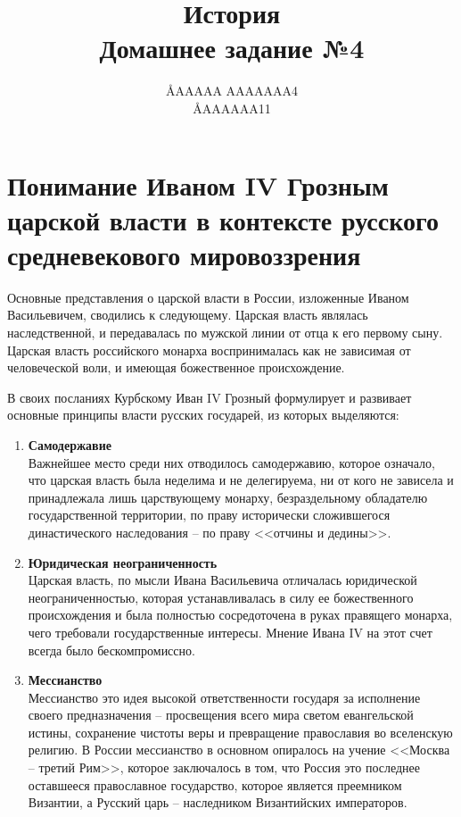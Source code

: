 \documentclass[12pt]{article}
\title{История \\ Домашнее задание №4}
\author{\AA{AAAAA AAAAAAA}{4} \\ \AA{AAAAAA}{11}}
\newcommand{\red}[1]{{\color{red}{#1}}}
\begin{document}
  \maketitle
  \setcounter{section}{1}

  \section{Понимание Иваном IV Грозным царской власти в контексте русского средневекового мировоззрения}

  Основные представления о царской власти в России, изложенные Иваном Васильевичем, сводились к следующему.
  Царская власть являлась наследственной, и передавалась по мужской линии от отца к его первому сыну.
  Царская власть российского монарха воспринималась как не зависимая от человеческой воли, и имеющая божественное происхождение.

  В своих посланиях Курбскому Иван IV Грозный формулирует и развивает основные принципы власти русских государей, из которых выделяются:

  \begin{enumerate}[label=\textbf{\large\arabic*}]
    \item {\bf\large Самодержавие} \\
    Важнейшее место среди них отводилось самодержавию, которое означало,
    что царская власть была неделима и не делегируема, ни от кого не зависела и принадлежала лишь царствующему монарху,
    безраздельному обладателю государственной территории,
    по праву исторически сложившегося династического наследования -- по праву <<отчины и дедины>>.

    \item {\bf\large Юридическая неограниченность} \\
    Царская власть, по мысли Ивана Васильевича отличалась юридической неограниченностью,
    которая устанавливалась в силу ее божественного происхождения и была полностью сосредоточена в руках правящего монарха,
    чего требовали государственные интересы.
    Мнение Ивана IV на этот счет всегда было бескомпромиссно.

    \item {\bf\large Мессианство} \\
    Мессианство это идея высокой ответственности государя за исполнение своего предназначения --
    просвещения всего мира светом евангельской истины, сохранение чистоты веры и превращение православия во вселенскую религию.
    В России мессианство в основном опиралось на учение <<Москва -- третий Рим>>, которое заключалось в том, что
    Россия это последнее оставшееся православное государство, которое является преемником Византии,
    а Русский царь -- наследником Византийских императоров.
  \end{enumerate}
\end{document}
